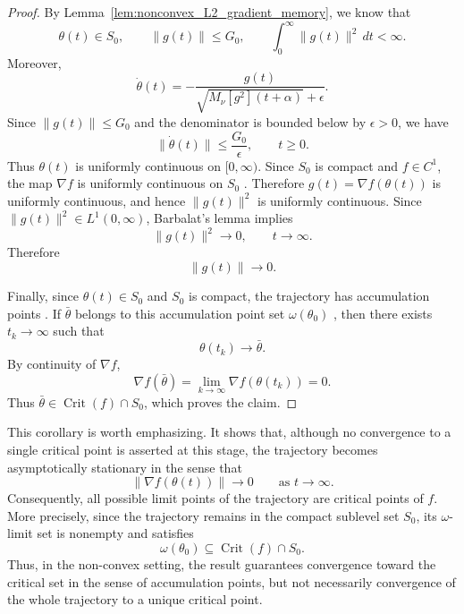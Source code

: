 \documentclass{article} %
\begin{document}
\begin{proof}
By Lemma~\ref{lem:nonconvex_L2_gradient_memory}, we know that
\[
    \theta(t)\in S_0,
    \qquad
    \|g(t)\|\leq G_0,
    \qquad
    \int_0^\infty \|g(t)\|^2\,dt<\infty.
\]
Moreover,
\[
    \dot\theta(t)
    =
    -
    \frac{g(t)}
    {\sqrt{M_\nu[g^2](t+\alpha)}+\epsilon}.
\]
Since \(\|g(t)\|\leq G_0\) and the denominator is bounded below by \(\epsilon>0\), we have
\[
    \|\dot\theta(t)\|
    \leq
    \frac{G_0}{\epsilon},
    \qquad t\geq0.
\]
Thus \(\theta(t)\) is uniformly continuous on \([0,\infty)\). Since \(S_0\) is compact and \(f\in C^1\), the map \(\nabla f\) is uniformly continuous on \(S_0\) \cite[Theorem 4.19]{Rudin1976}. Therefore $g(t)=\nabla f(\theta(t))$ is uniformly continuous, and hence \(\|g(t)\|^2\) is uniformly continuous. Since $\|g(t)\|^2\in L^1(0,\infty)$, Barbalat's lemma \cite{Barbalat1959} implies
\[
    \|g(t)\|^2\to0,
    \qquad t\to\infty.
\]
Therefore
\[
    \|g(t)\|\to0.
\]

Finally, since \(\theta(t)\in S_0\) and \(S_0\) is compact, the trajectory has accumulation points  \cite[Theorem 3.6(a)]{Rudin1976}. If \(\bar\theta\) belongs to this accumulation point set \(\omega(\theta_0)\) \cite[Section~6.3, p.~193]{Teschl2012}, then there exists \(t_k\to\infty\) such that
\[
    \theta(t_k)\to\bar\theta.
\]
By continuity of \(\nabla f\),
\[
    \nabla f(\bar\theta)
    =
    \lim_{k\to\infty}\nabla f(\theta(t_k))
    =
    0.
\]
Thus \(\bar\theta\in \operatorname{Crit}(f)\cap S_0\), which proves the claim.
\end{proof}

This corollary is worth emphasizing. It shows that, although no convergence to a single critical point is asserted at this stage, the trajectory becomes asymptotically stationary in the sense that
\[
    \|\nabla f(\theta(t))\|\to0
    \qquad\text{as }t\to\infty.
\]
Consequently, all possible limit points of the trajectory are critical points of $f$. More precisely, since the trajectory remains in the compact sublevel set \(S_0\), its \(\omega\)-limit set is nonempty and satisfies
\[
    \omega(\theta_0)\subseteq \operatorname{Crit}(f)\cap S_0.
\]
Thus, in the non-convex setting, the result guarantees convergence toward the critical set in the sense of accumulation points, but not necessarily convergence of the whole trajectory to a unique critical point.
\end{document}
